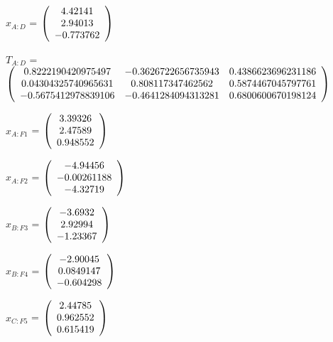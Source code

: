 \begin{description}
$x_{A:D}$ = $\left( \begin{array} {ccc}    4.42141 \\    2.94013 \\  -0.773762
\end{array} \right)\\ \\$

$T_{A:D}$ = $\left( \begin{array} {ccc} 
   0.8222190420975497 & -0.3626722656735943 & 0.4386623696231186 \\ 
   0.04304325740965631 & 0.808117347462562 & 0.5874467045797761 \\ 
   -0.5675412978839106 & -0.4641284094313281 & 0.6800600670198124 \\
\end{array} \right)\\ \\$

$x_{A:F1}$ = $\left( \begin{array} {ccc}    3.39326 \\    2.47589 \\   0.948552
\end{array} \right)\\ \\$

$x_{A:F2}$ = $\left( \begin{array} {ccc}   -4.94456 \\ -0.00261188 \\   -4.32719
\end{array} \right)\\ \\$

$x_{B:F3}$ = $\left( \begin{array} {ccc}    -3.6932 \\    2.92994 \\   -1.23367
\end{array} \right)\\ \\$

$x_{B:F4}$ = $\left( \begin{array} {ccc}   -2.90045 \\  0.0849147 \\  -0.604298
\end{array} \right)\\ \\$

$x_{C:F5}$ = $\left( \begin{array} {ccc}    2.44785 \\   0.962552 \\   0.615419
\end{array} \right)\\ \\$


\end{description}
